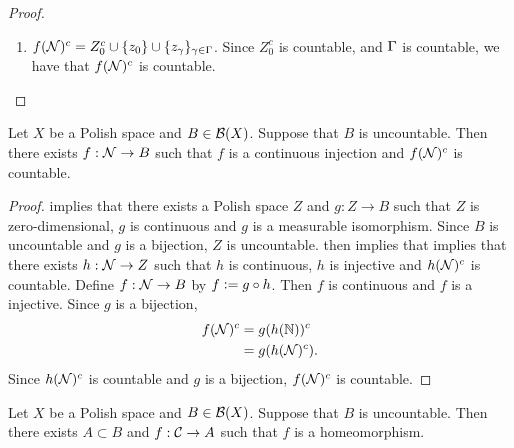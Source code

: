 \documentclass{book}
\begin{document}
\begin{proof}
\begin{enumerate}
\begin{itemize}
\begin{align*}
					& = C_{\gam_1} \cap C_{\gam_2} \\
					& = \varnothing
				\end{align*}
				which is a contradiction.
			\end{itemize}
			Thus $A = \varnothing$ and for each $n \in \N$, $\pi_n(\om_1) \neq \pi_n(\om_2)$. Thus $\om_1 = \om_2$. Since $\om_1, \om_2 \in \MN$ are arbitrary, we have that for each $\om_1, \om_2 \in \MN$, $f(\om_1) = f(\om_2)$ implies that $\om_1 = \om_2$. Thus $f$ is injective. 
			\item $f(\mathcal{N})^c = Z_0^c \cup \{z_0\} \cup \{z_{\gamma}\}_{\gamma \in \Gamma}$. Since $Z_0^c$ is countable, and $\Gamma$ is countable, we have that $f(\mathcal{N})^c$ is countable.
		\end{enumerate}
	\end{proof}
	
	
	
	

	
	
	\begin{ex} 
		Let $X$ be a Polish space and $B \in \mathcal{B}(X)$. Suppose that $B$ is uncountable. Then there exists $f: \mathcal{N} \rightarrow B$ such that $f$ is a continuous injection and $f(\mathcal{N})^c$ is countable.
	\end{ex}

	\begin{proof}
		 implies that there exists a Polish space $Z$ and $g:Z \rightarrow B$ such that $Z$ is zero-dimensional, $g$ is continuous and $g$ is a measurable isomorphism. Since $B$ is uncountable and $g$ is a bijection, $Z$ is uncountable.  then implies that implies that there exists $h:\mathcal{N} \rightarrow Z$ such that $h$ is continuous, $h$ is injective and $h(\mathcal{N})^c$ is countable. Define $f: \mathcal{N} \rightarrow B$ by $f \vcentcolon= g \circ h$. Then $f$ is continuous and $f$ is a injective. Since $g$ is a bijection,
		\begin{align*}
			f(\mathcal{N})^c
			& = g (h(\mathbb{N}))^c \\
			& = g(h(\mathcal{N})^c).
		\end{align*} 
		Since $h(\mathcal{N})^c$ is countable and $g$ is a bijection, $f(\mathcal{N})^c$ is countable.
	\end{proof}
	
	
	\begin{ex} 
		Let $X$ be a Polish space and $B \in \mathcal{B}(X)$. Suppose that $B$ is uncountable. Then there exists $A \subset B$ and $f: \mathcal{C} \rightarrow A$ such that $f$ is a homeomorphism. 
	\end{ex}
	
\end{document}
